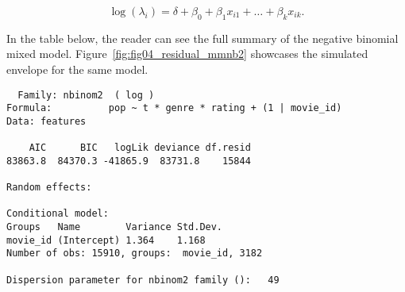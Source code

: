 $$
\log(\lambda_i) = \delta + \beta_0 + \beta_1 x_{i1} + \dots + \beta_k x_{ik}.
$$

In the table below, the reader can see the full summary of the negative binomial
mixed model. Figure~\ref{fig:fig04_residual_mmnb2} showcases the simulated
envelope for the same model.

\begin{verbatim}
  Family: nbinom2  ( log )
Formula:          pop ~ t * genre * rating + (1 | movie_id)
Data: features

    AIC      BIC   logLik deviance df.resid
83863.8  84370.3 -41865.9  83731.8    15844

Random effects:

Conditional model:
Groups   Name        Variance Std.Dev.
movie_id (Intercept) 1.364    1.168
Number of obs: 15910, groups:  movie_id, 3182

Dispersion parameter for nbinom2 family ():   49


\end{verbatim}
